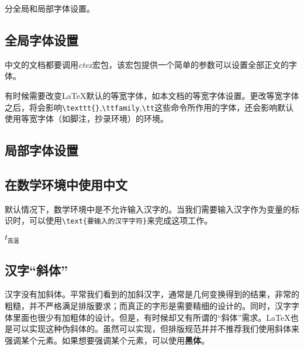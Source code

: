 {分全局和局部字体设置。
\subsection{全局字体设置}
中文的文档都要调用\emph{ctex}宏包，该宏包提供一个简单的参数可以设置全部正文的字体。

\begin{latex}
\setmainfont{Times New Roman}    %
\end{latex}

有时候需要改变\LaTeX 默认的等宽字体，如本文档的等宽字体设置。更改等宽字体之后，将会影响\lstinline|\texttt{}|,\lstinline|\ttfamily|,\lstinline|\tt|这些命令所作用的字体，还会影响默认使用等宽字体（如脚注，抄录环境）的环境。

\begin{latex}
\setmonofont{Source Code Pro}    %
\end{latex}

\subsection{局部字体设置}

\begin{latex}
\newfontfamily{}    %
\end{latex}

\subsection{在数学环境中使用中文}
默认情况下，数学环境中是不允许输入汉字的。当我们需要输入汉字作为变量的标识时，可以使用\lstinline|\text{要输入的汉字字符}|来完成这项工作。

\begin{codeshow}
$t_{\text{高温}}$
\end{codeshow}

\subsection{汉字“斜体”}
汉字没有加斜体。平常我们看到的加斜汉字，通常是几何变换得到的结果，非常的粗糙，并不严格满足排版要求；而真正的字形是需要精细的设计的。同时，汉字字体里面也很少有加粗体的设计。但是，有时候却又有所谓的“斜体”需求。\LaTeX 也是可以实现这种伪斜体的。虽然可以实现，但排版规范并并不推荐我们使用斜体来强调某个元素。如果想要强调某个元素，可以使用\textbf{黑体}。

}
